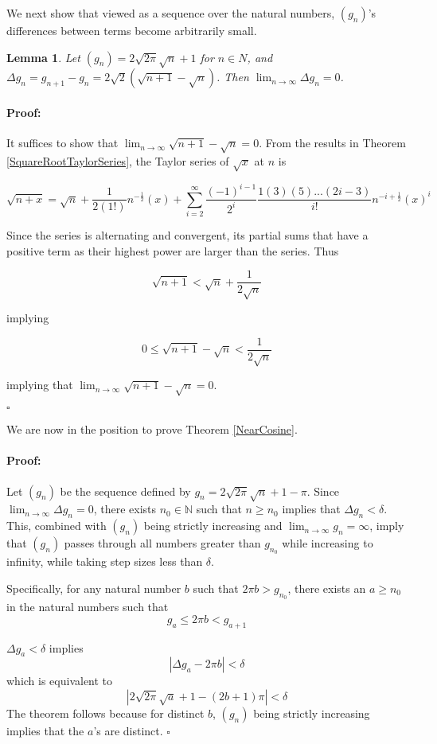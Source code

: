 \documentclass{article}
\newenvironment{proof}{\paragraph{Proof:}}{\hfill$\square$}
\newtheorem{lemma}[theorem]{Lemma}
\begin{document}
We next show that viewed as a sequence over the natural numbers, $(g_n)$'s differences between terms become arbitrarily small.

\begin{lemma}
\label{LimitDeltaGIs0}
Let $(g_n) = 2\sqrt{2 \pi}\sqrt{n} + 1$ for $n \in N$, and $\Delta g_n = g_{n+1} - g_n = 2\sqrt{2}(\sqrt{n+1} - \sqrt{n})$. Then $\lim_{n\rightarrow\infty} \Delta g_n = 0$.
\end{lemma}

\begin{proof}
It suffices to show that $\lim_{n\rightarrow\infty} \sqrt{n+1} - \sqrt{n} = 0$. From the results in Theorem \ref{SquareRootTaylorSeries}, the Taylor series of $\sqrt{x}$ at $n$ is

\[
\sqrt{n+x} = \sqrt{n} + \frac{1}{2(1!)} n^{-\frac{1}{2}}(x) + \sum_{i=2}^{\infty} \frac{(-1)^{i-1}}{2^i} \frac{1(3)(5)...(2i-3)}{i!} n^{-i + \frac{1}{2}}(x)^i
\]

Since the series is alternating and convergent, its partial sums that have a positive term as their highest power are larger than the series. Thus

\[
\sqrt{n+1} < \sqrt{n} + \frac{1}{2\sqrt{n}}
\]

implying

\[
0 \leq \sqrt{n+1}- \sqrt{n} < \frac{1}{2\sqrt{n}}
\]

implying that $\lim_{n\rightarrow\infty} \sqrt{n+1} - \sqrt{n} = 0$.

\end{proof}

We are now in the position to prove Theorem \ref{NearCosine}.

\begin{proof}
Let $(g_n)$ be the sequence defined by $g_n = 2\sqrt{2\pi}\sqrt{n} + 1 - \pi$. Since $\lim_{n\rightarrow\infty} \Delta g_n = 0$, there exists $n_0 \in \mathbb{N}$ such that $n \geq n_0$ implies that $\Delta g_n < \delta$. This, combined with $(g_n)$ being strictly increasing and $\lim_{n\rightarrow\infty} g_n = \infty$, imply that $(g_n)$ passes through all numbers greater than $g_{n_0}$ while increasing to infinity, while taking step sizes less than $\delta$.

Specifically, for any natural number $b$ such that $2\pi b > g_{n_0}$, there exists an $a \geq n_0$ in the natural numbers such that
\[
g_a \leq 2\pi b < g_{a+1}
\]

$\Delta g_a < \delta$ implies
\[
|\Delta g_a - 2\pi b| < \delta
\]
which is equivalent to
\[
|2\sqrt{2\pi}\sqrt{a} + 1 - (2b + 1)\pi| < \delta
\]
The theorem follows because for distinct $b$, $(g_n)$ being strictly increasing implies that the $a$'s are distinct.
\end{proof}
\end{document}
